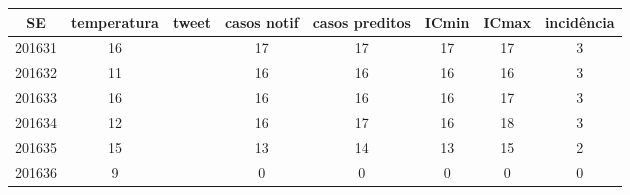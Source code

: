 \begin{tabular}{c|ccccccc}
  \hline
SE & temperatura & tweet & casos notif & casos preditos & ICmin & ICmax & incidência \\ 
  \hline
201631 & 16 &  & 17 & 17 & 17 & 17 & 3 \\ 
  201632 & 11 &  & 16 & 16 & 16 & 16 & 3 \\ 
  201633 & 16 &  & 16 & 16 & 16 & 17 & 3 \\ 
  201634 & 12 &  & 16 & 17 & 16 & 18 & 3 \\ 
  201635 & 15 &  & 13 & 14 & 13 & 15 & 2 \\ 
  201636 & 9 &  & 0 & 0 & 0 & 0 & 0 \\ 
   \hline
\end{tabular}
